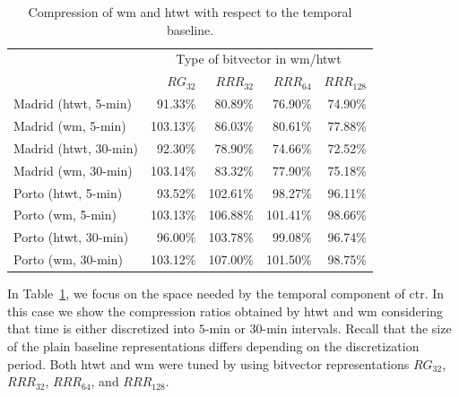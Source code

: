 	\begin{table}[htb]
	\begin{center}
	\scriptsize
	\setlength\tabcolsep{2pt}
	  \begin{tabular}{|l|*{4}{r}|}
	  \cline{2-5}
	  \multicolumn{1}{c|}{} & \multicolumn{4}{c|}{Type of bitvector in \gls{wm}/\gls{htwt}}\\

	  \multicolumn{1}{c|}{}   & $RG_{32}$& $RRR_{32}$& $RRR_{64}$& $RRR_{128}$\\
	  \hline                                             
	  Madrid (\gls{htwt}, 5-min) &  91.33\% &	 80.89\% &	 76.90\% & 	 74.90\% \\
	  Madrid (\gls{wm}, 5-min)   & 103.13\% &	 86.03\% &	 80.61\% & 	 77.88\% \\
	  Madrid (\gls{htwt}, 30-min)&  92.30\% &	 78.90\% &	 74.66\% &	 72.52\% \\
	  Madrid (\gls{wm}, 30-min)  & 103.14\% &	 83.32\% &	 77.90\% &	 75.18\% \\
	  \hline                  
	  Porto (\gls{htwt}, 5-min)  &  93.52\% &	102.61\% &	 98.27\% &	 96.11\% \\
	  Porto (\gls{wm}, 5-min)    & 103.13\% &	106.88\% &	101.41\% &	 98.66\% \\
	  Porto (\gls{htwt}, 30-min) &  96.00\% &	103.78\% &	 99.08\% &	 96.74\% \\
	  Porto (\gls{wm}, 30-min)   & 103.12\% &	107.00\% &	101.50\% &	 98.75\% \\

	  \hline
	  \cline{2-5}
	  \end{tabular}
	\caption{Compression of \acrlong{wm} and \acrlong{htwt} with respect to the temporal baseline.}
	\label{table:ctr_wt_spaces}
	\vspace{-3mm}
	\end{center}
	\end{table}



	In Table~\ref{table:ctr_wt_spaces}, we focus on the space needed by the temporal component of \gls{ctr}. 
	In this case we show the compression ratios obtained by \gls{htwt} and \gls{wm} %
	considering that time is either discretized into $5$-min or $30$-min intervals. Recall that the size of the 
	plain baseline representations differs depending on the discretization period. Both \gls{htwt} and \gls{wm} were tuned by
	using bitvector representations $RG_{32}$, $RRR_{32}$, $RRR_{64}$, and $ RRR_{128}$.

